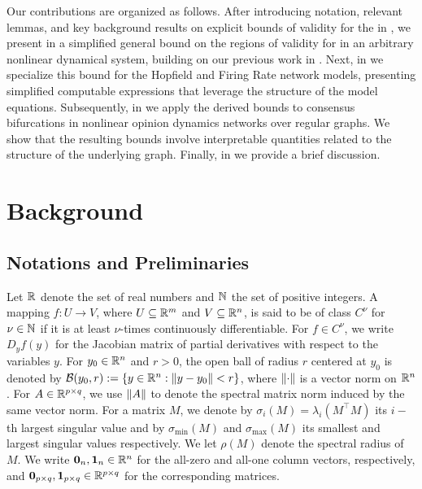 \documentclass[letterpaper, 10 pt, conference]{ieeeconf}
\begin{document}
Our contributions are organized as follows. After introducing notation, relevant lemmas, and key background results on explicit bounds of validity for the \LSR{} in , we present in  a simplified general bound on the regions of validity for \LSR{} in an arbitrary nonlinear dynamical system, building on our previous work in \cite{gupta2024estimates}.
Next, in  we specialize this bound for the Hopfield and Firing Rate network models, presenting simplified computable expressions that leverage the structure of the model equations.
Subsequently, in  we apply the derived bounds to consensus bifurcations in nonlinear opinion dynamics networks over regular graphs. We show that the resulting bounds involve interpretable quantities related to the structure of the underlying graph.
Finally, in  we provide a brief discussion.


\section{Background}
\label{sec:background}

\subsection{Notations and Preliminaries}
\label{subsec:prelims}

Let \(\R\) denote the set of real numbers and \(\N\) the set of positive integers.
A mapping \(f : U \to V\), where \(U \subseteq \R[m]\) and  \(V \subseteq \R[n]\), is said to be of class \(C^\nu\) for \(\nu \in \N\) if it is at least \(\nu\)-times continuously differentiable. For \(f \in C^{\nu}\), we write \(D_{y} f(y)\) for the Jacobian matrix of partial derivatives with respect to the variables \(y\). For \(y_{0} \in \R[n]\) and \(r > 0\), the open ball of radius \(r\) centered at \(y_{0}\) is denoted by \(\mathcal{B}(y_0,r) := \{y \in \R[n] : \norm{y - y_0} < r\}\), where \(\norm{\cdot}\) is a vector norm on \(\R[n]\). For \(A \in \R[p \times q]\), we use \(\norm{A}\) to denote the spectral matrix norm induced by the same vector norm.
For a matrix \(M\), we denote by \(\sigma_{i}(M) = \lambda_i(M^{\top} M)\) its \(i-\)th largest singular value and by \(\sigma_{\min}(M)\) and \(\sigma_{\max}(M)\) its smallest and largest singular values respectively. We let \(\rho(M)\) denote the spectral radius of \(M\).
We write \(\mathbf{0}_{n}, \mathbf{1}_{n} \in \R[n]\) for the all-zero and all-one column vectors, respectively, and \(\mathbf{0}_{p \times q}, \mathbf{1}_{p \times q} \in \R[p \times q]\) for the corresponding matrices.
\end{document}
